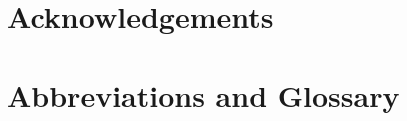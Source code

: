\documentclass[11pt,nofootinbib]{report}
\begin{document}
\newpage
\thispagestyle{empty}
	\setcounter{secnumdepth}{0}

%		
	\section{Acknowledgements}\label{Acknowledgments}
		
		\thispagestyle{empty}
		\newpage
	

	\section {Abbreviations and Glossary}\label{Abbreviations}
	
	\newpage
\end{document}
